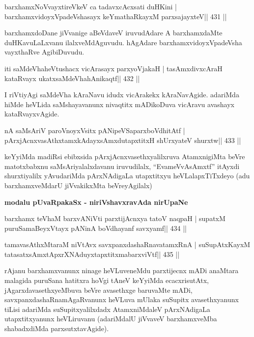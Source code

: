 \begin{shl}
barxhamxNoV\s vayxtireVkeV ca tadavxcAcxsati duHKini |
barxhamxvidoyxVpadeVshasayx keYmathaRkayxM parxsajayxteV\hfill || 431 ||
\end{shl}

\begin{artha}
barxhamxdoDane jiVvanige aBeVdaveV iruvudAdare A barxhamxdaMte duHKavuLaLxvanu ilalxveMdAguvudu. hAgAdare barxhamxvidoyxVpadeVsha vayxthaRve AgibiDuvudu.
\end{artha}

\begin{shl}
iti saMdeVhaheVtushacx vicArasayx parxyoVjakaH |
tasAmxdivxcAraH kataRvayx ukatxsaMdeVhahAnikaqtf\hfill || 432 ||
\end{shl}

\begin{artha}
I riVtiyAgi saMdeVha kAraNavu idudx vicArakekx kAraNavAgide. adariMda hiMde heVLida saMshayavanunx nivaqtitx mADikoDuva vicAravu avashayx kataRvayxvAgide.
\end{artha}

\begin{shl}
nA saMsAriV paroV\s noyxV\s sitx pANipeVSaparxboVdhitAtf |
pArxjAcnxvasAthxtamxkAdayxsAmxdutapxtitxH shUrxyateV shurxtw\hfill || 433 ||
\end{shl}

\begin{artha}
keYyiMda madiRsi ebibxsida pArxjAcnxvasethxyalilxruva AtamxnigiMta
beVre matotxbabxnu saMsAriyalalxdavanu iruvudilalx, ``EvameVvAsAmxtf''
itAyxdi shurxtiyalilx yAvudariMda pArxNAdigaLa utapxtitxyu
heVLalapxTiTxdeyo (adu barxhamxveMdarU jiVvakikxMta beVreyAgilalx)
\end{artha}

\medskip
\centerline{\Large{\textbf{modalu pUvaRpakaSx - niriVshavxravAda nirUpaNe}}}

\medskip

\begin{shl}
barxhamx teV\s haM barxvANiVti parxtijAcnxya tatoV naqpaH |
supatxM puruSamaBeyxVtayx pANinA boVdhayanf savxyamf\hfill || 434 ||
\end{shl}

\begin{shl}
tamavasAthxMtaraM niVtAvx savxpanxdashaRnavatamxRnA |
suSupAtxKayxM tatasatxsAmxtApxrXNAduyxtapxtitxmabarxviVtf\hfill || 435 ||
\end{shl}

\begin{artha}
rAjanu barxhamxvanunx ninage heVLuveneMdu parxtijecnx mADi anaMtara
malagida puruSana hatitxra hoVgi tAneV keYyiMda ecacxrisutAtx,
jAgarxdavasethxyeMbuva beVre avasethxge baruvaMte mADi,
savxpanxdashaRnamAgaRvanunx heVLuva mUlaka suSupitx avasethxyanunx
tiLisi adariMda suSupitxyalilxdadx AtamxniMdaleV pArxNAdigaLa
utapxtitxyanunx heVLiruvanu (adariMdalU jiVvaveV barxhamxveMba
shabadxdiMda parxsutxtavAgide).
\end{artha}

